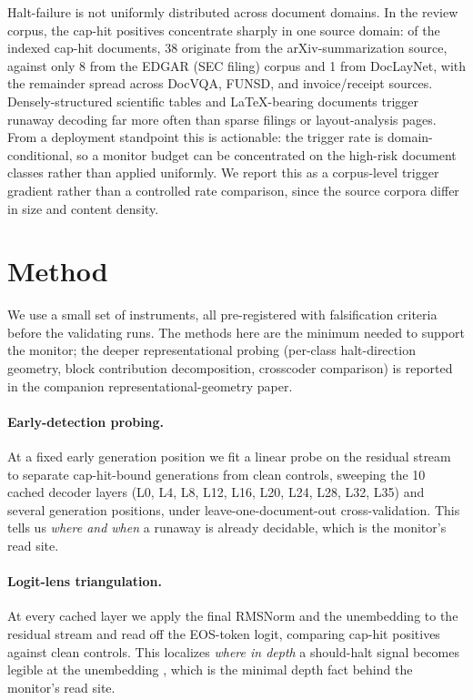\documentclass[11pt]{article}
\begin{document}
Halt-failure is not uniformly distributed across document domains. In the review corpus,
the cap-hit positives concentrate sharply in one source domain: of the indexed cap-hit
documents, 38 originate from the arXiv-summarization source, against only 8 from the
EDGAR (SEC filing) corpus and 1 from DocLayNet, with the remainder spread across DocVQA,
FUNSD, and invoice/receipt sources. Densely-structured scientific tables and LaTeX-bearing
documents trigger runaway decoding far more often than sparse filings or layout-analysis
pages. From a deployment standpoint this is actionable: the trigger rate is
domain-conditional, so a monitor budget can be concentrated on the high-risk document
classes rather than applied uniformly. We report this as a corpus-level trigger gradient
rather than a controlled rate comparison, since the source corpora differ in size and
content density.

\section{Method}
\label{sec:method}

We use a small set of instruments, all pre-registered with falsification criteria
before the validating runs. The methods here are the minimum needed to support the
monitor; the deeper representational probing (per-class halt-direction geometry, block
contribution decomposition, crosscoder comparison) is reported in the companion
representational-geometry paper.

\paragraph{Early-detection probing.}
At a fixed early generation position we fit a linear probe on the residual stream to
separate cap-hit-bound generations from clean controls, sweeping the 10 cached decoder
layers (L0, L4, L8, L12, L16, L20, L24, L28, L32, L35) and several generation positions,
under leave-one-document-out cross-validation. This tells us \emph{where and when} a
runaway is already decidable, which is the monitor's read site.

\paragraph{Logit-lens triangulation.}
At every cached layer we apply the final RMSNorm and the unembedding to the residual
stream and read off the EOS-token logit, comparing cap-hit positives against clean
controls. This localizes \emph{where in depth} a should-halt signal becomes legible at the
unembedding \citep{belrose2023tunedlens}, which is the minimal depth fact behind the
monitor's read site.
\end{document}
